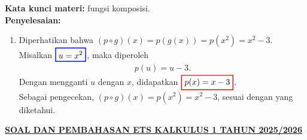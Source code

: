 \documentclass[10pt,openany,a4paper]{article}
\theoremstyle{definition}
\theoremstyle{definition}
\theoremstyle{plain}
\newenvironment{jawab}[2][tes]{%
\par\noindent\textbf{Kata kunci materi:} #1.\\
\textbf{Penyelesaian:} #2%
}{}
\begin{document}
\begin{enumerate}
\begin{jawab}[fungsi komposisi]
{\begin{enumerate}
                    \item Diperhatikan bahwa $(p\circ g)(x) = p(g(x)) = p(x^2) = x^2-3$. Misalkan $\colorlet{oldcolor}{.}
        \color{blue}
        \setlength{\fboxrule}{1pt} \boxed{\color{oldcolor}u = x^2}\color{oldcolor}$, maka diperoleh
                    \begin{align*}
                        p(u) = u - 3.
                    \end{align*}
                    Dengan mengganti $u$ dengan $x$, didapatkan $\colorlet{oldcolor}{.}
        \color{red}
        \setlength{\fboxrule}{1pt} \boxed{\color{oldcolor}p(x) = x - 3}\color{oldcolor}$.\\
                    Sebagai pengecekan, $(p\circ g)(x) = p(x^2) = x^2 - 3$, sesuai dengan yang diketahui.
                \end{enumerate}
            }
            \end{jawab}
        \end{enumerate}

\newpage
 \begin{center}
	{\underline{\textbf{\MakeUppercase{Soal dan Pembahasan ETS Kalkulus 1 Tahun 2025/2026}}}}
    \end{center}
\end{document}
